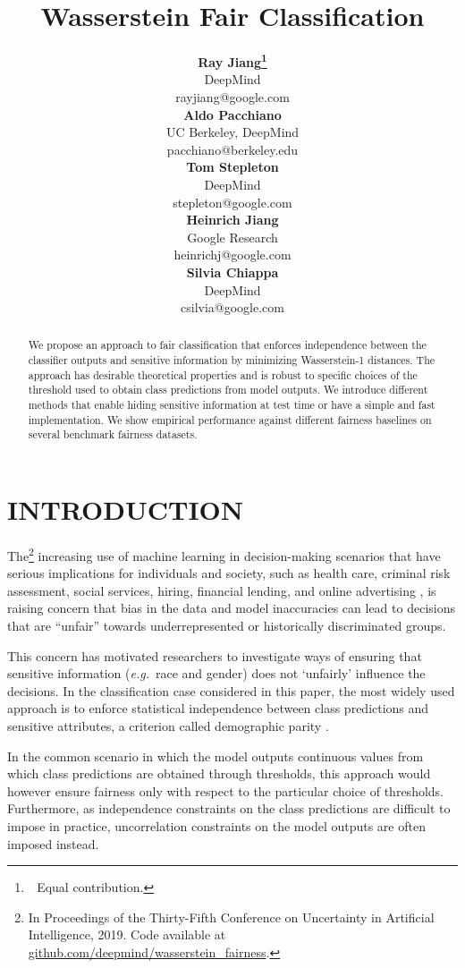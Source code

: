 \documentclass[letterpaper]{article}
\title{Wasserstein Fair Classification}
\author{{\bf Ray Jiang\thanks{\,\, Equal contribution.}} \\
DeepMind \\
rayjiang@google.com\\
\And
{\bf Aldo Pacchiano\footnotemark[1]}  \\
UC Berkeley, DeepMind \\
pacchiano@berkeley.edu 
\\
\And
{\bf Tom Stepleton}   \\
DeepMind \\
stepleton@google.com    \\
\AND
{\bf Heinrich Jiang}   \\
Google Research \\
heinrichj@google.com    \\
\And
{\bf Silvia Chiappa}   \\
DeepMind \\
csilvia@google.com    \\
}
\newcommand{\eg}{\emph{e.g.}}
\theoremstyle{definition}
\begin{document}
\maketitle

\begin{abstract}
We propose an approach to fair classification that enforces independence between the classifier outputs and sensitive information by minimizing Wasserstein-1 distances. The approach has desirable theoretical properties and is robust to specific choices of the threshold used to obtain class predictions from model outputs. We introduce different methods that enable hiding sensitive information at test time or have a simple and fast implementation. We show empirical performance against different fairness baselines on several benchmark fairness datasets.
\end{abstract}

\section{INTRODUCTION}
The{\let\thefootnote\relax\footnote{{In Proceedings of the Thirty-Fifth Conference on Uncertainty in Artificial Intelligence, 2019. Code available at \href{https://github.com/deepmind/wasserstein_fairness}{github.com/deepmind/wasserstein\_fairness}.}}}
increasing use of machine learning in decision-making scenarios that have serious implications for individuals and society, such as health care, criminal risk assessment, social services, hiring, financial lending, and online advertising \citep{defauw18clinically, dieterich16compas, eubanks18automating, hoffman18discretion, malekipirbazari15risk, perlich14machine}, is raising concern that bias in the data and model inaccuracies can lead to decisions that are ``unfair'' towards underrepresented or historically discriminated groups. 

This concern has motivated researchers to investigate ways of ensuring that sensitive information (\eg~race and gender) does not ‘unfairly’ influence the decisions. In the classification case considered in this paper, the most widely used approach is to enforce statistical independence between class predictions and sensitive attributes, a criterion called demographic parity \citep{feldman15certifying}. 

In the common scenario in which the model outputs continuous values from which class predictions are obtained through thresholds, this approach would however ensure fairness only with respect to the particular choice of thresholds. 
Furthermore, as independence constraints on the class predictions are difficult to impose in practice, uncorrelation constraints on the model outputs are often imposed instead.
\end{document}
